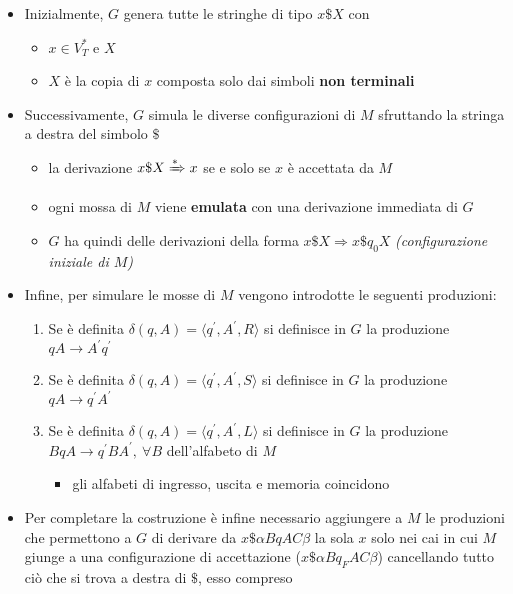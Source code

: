 \documentclass[italian, 10pt]{article}
\begin{document}
\begin{itemize}
  \item Inizialmente, \(G\) genera tutte le stringhe di tipo \(x \$ X\) con
        \begin{itemize}
          \item  \(x \in V_T^\ast\) e \(X\)
          \item \(X\) è la copia di \(x\) composta solo dai simboli \textbf{non terminali}
        \end{itemize}
  \item Successivamente, \(G\) simula le diverse configurazioni di \(M\) sfruttando la stringa a destra del simbolo \(\$\)
        \begin{itemize}
          \item la derivazione \(x \$ X \xRightarrow{\ast} x\) se e solo se \(x\) è accettata da \(M\)
          \item ogni mossa di \(M\) viene \textbf{emulata} con una derivazione immediata di \(G\)
          \item \(G\) ha quindi delle derivazioni della forma \(x \$ X \Rightarrow x \$ q_0 X\) \textit{(configurazione iniziale di \(M\))}
        \end{itemize}
  \item Infine, per simulare le mosse di \(M\) vengono introdotte le seguenti produzioni:
        \begin{enumerate}
          \item Se è definita \(\delta(q, A) = \langle q^\prime, A^\prime, R \rangle\) si definisce in \(G\) la produzione \(qA \rightarrow A^\prime q^\prime\)
          \item Se è definita \(\delta(q, A) = \langle q^\prime, A^\prime, S \rangle\) si definisce in \(G\) la produzione \(qA \rightarrow q^\prime A^\prime\)
          \item Se è definita \(\delta(q, A) = \langle q^\prime, A^\prime, L \rangle\) si definisce in \(G\) la produzione \(BqA \rightarrow q^\prime B A^\prime, \ \forall B\) dell'alfabeto di \(M\)
                \begin{itemize}[label=\(\rightarrow\)]
                  \item gli alfabeti di ingresso, uscita e memoria coincidono
                \end{itemize}
        \end{enumerate}
  \item Per completare la costruzione è infine necessario aggiungere a \(M\) le produzioni che permettono a \(G\) di derivare da \(x \$ \alpha B q A C \beta\) la sola \(x\) solo nei cai in cui \(M\) giunge a una configurazione di accettazione (\(x \$ \alpha B q_F A C \beta\)) cancellando tutto ciò che si trova a destra di \(\$\), esso compreso
\end{itemize}
\end{document}
